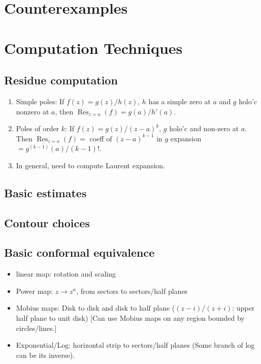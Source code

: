 \documentclass{article}
\theoremstyle{definition}
\theoremstyle{remark}
\theoremstyle{plain}
\begin{document}
\section{Counterexamples}
\section{Computation Techniques}
\subsection{Residue computation}
\begin{enumerate}
    \item Simple poles: If $f(z)=g(z)/h(z)$, $h$ has a simple zero at $a$ and $g$ holo'c nonzero at $a$, then $\operatorname{Res}_{z=a}(f)=g(a)/h'(a)$.
    \item Poles of order $k$: If $f(z)=g(z)/(z-a)^k$, $g$ holo'c and non-zero at $a$. Then $\operatorname{Res}_{z=a}(f)=$ coeff of $(z-a)^{k-1}$ in $g$ expansion $= g^{(k-1)}(a)/(k-1)!$.
    \item In general, need to compute Laurent expansion.
\end{enumerate}
\subsection{Basic estimates}
\subsection{Contour choices}
\subsection{Basic conformal equivalence}
\begin{itemize}
    \item linear map: rotation and scaling
    \item Power map: $z\to z^n$, from sectors to sectors/half planes
    \item Mobius maps: Disk to disk and disk to half plane ($(z-i)/(z+i)$: upper half plane to unit disk) [Can use Mobius maps on any region bounded by circles/lines.]
    \item Exponential/Log: horizontal strip to sectors/half planes (Some branch of log can be its inverse).
\end{itemize}
\end{document}
